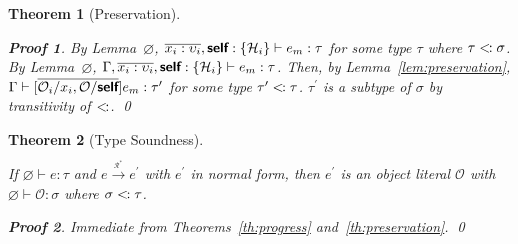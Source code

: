 \documentclass[a4paper, 11pt]{article}
\def\H{\mathcal{H}}
\def\O{\mathcal{O}}
\def\sub{<\kern-1pt:}
\def\bo{{\sffamily\{}}
\def\bc{{\sffamily\}}}
\newcommand{\type}[1]{\text{\bo}#1\text{\bc}}
\newcommand{\self}{\text{\sffamily\bfseries self}}
\def\rtot{\overset{_{\mathcal{R}^*}}{\longrightarrow}}
\theoremstyle{theorem}
\newtheorem{theorem}{Theorem}
\theoremstyle{lemma}
\theoremstyle{tproof}
\newtheorem*{tproof}{Proof}
\theoremstyle{lproof}
\theoremstyle{tcase}
\theoremstyle{lcase}
\begin{document}
\begin{theorem}[Preservation]
\begin{tproof}
\noindent By Lemma~$\varnothing$,
$\*x_i : \upsilon_i*, \self : \type{\H_i} \vdash e_m : \tau$ for some type
$\tau$ where $\tau \sub \sigma$.  By Lemma~$\varnothing$,
$\Gamma, \*x_i : \upsilon_i*, \self : \type{\H_i} \vdash e_m : \tau$.  Then, by
Lemma~\ref{lem:preservation},
$\Gamma \vdash [\*\O_i/x_i,\O/\self*]e_m : \tau^\prime$ for some type
$\tau^\prime \sub \tau$.  $\tau^\prime$ is a subtype of $\sigma$ by transitivity
of $\sub$. \qed

\end{tproof}

\end{theorem}

\begin{theorem}[Type Soundness]
\label{th:type-soundness}

If $\varnothing \vdash e : \tau$ and $e \rtot e^\prime$ with $e^\prime$ in
normal form, then $e^\prime$ is an object literal $\O$ with $\varnothing \vdash
\O : \sigma$ where $\sigma \sub \tau$.

\begin{tproof}
Immediate from Theorems~\ref{th:progress} and~\ref{th:preservation}. \qed
\end{tproof}

\end{theorem}



\end{document}
